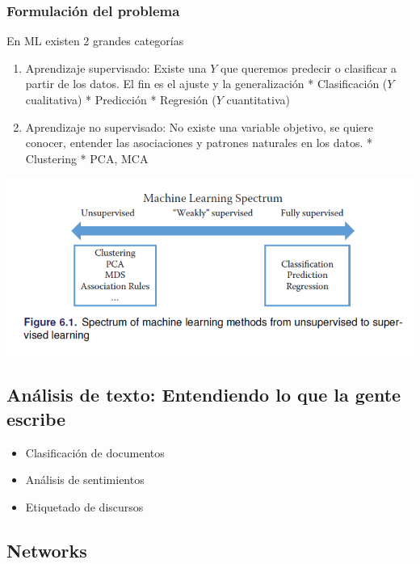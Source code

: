\documentclass[
]{book}
\providecommand{\tightlist}{%
  \setlength{\itemsep}{0pt}\setlength{\parskip}{0pt}}
\begin{document}
\hypertarget{formulaciuxf3n-del-problema}{%
\subsubsection{Formulación del problema}\label{formulaciuxf3n-del-problema}}

En ML existen 2 grandes categorías

\begin{enumerate}
\def\labelenumi{\arabic{enumi}.}
\item
  Aprendizaje supervisado: Existe una \(Y\) que queremos predecir o clasificar a partir de los datos. El fin es el ajuste y la generalización
  * Clasificación (\(Y\) cualitativa)
  * Predicción
  * Regresión (\(Y\) cuantitativa)
\item
  Aprendizaje no supervisado: No existe una variable objetivo, se quiere conocer, entender las asociaciones y patrones naturales en los datos.
  * Clustering
  * PCA, MCA
\end{enumerate}

\includegraphics{images/bd6.PNG}

\hypertarget{anuxe1lisis-de-texto-entendiendo-lo-que-la-gente-escribe}{%
\subsection{Análisis de texto: Entendiendo lo que la gente escribe}\label{anuxe1lisis-de-texto-entendiendo-lo-que-la-gente-escribe}}

\begin{itemize}
\tightlist
\item
  Clasificación de documentos
\item
  Análisis de sentimientos
\item
  Etiquetado de discursos
\end{itemize}

\hypertarget{networks}{%
\subsection{Networks}\label{networks}}
\end{document}
